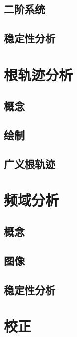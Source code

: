 \documentclass[
12pt, %
a4paper, 
oneside, %
headinclude,footinclude, %
]{scrartcl}
\begin{document}
\subsection[二阶系统]{二阶系统}
\subsection[稳定性分析]{稳定性分析}
\section{根轨迹分析}
\subsection[概念]{概念}
\subsection[绘制]{绘制}
\subsection[广义根轨迹]{广义根轨迹}
\section{频域分析}
\subsection[概念]{概念}
\subsection[图像]{图像}
\subsection[稳定性分析]{稳定性分析}
\section{校正}
\end{document}
